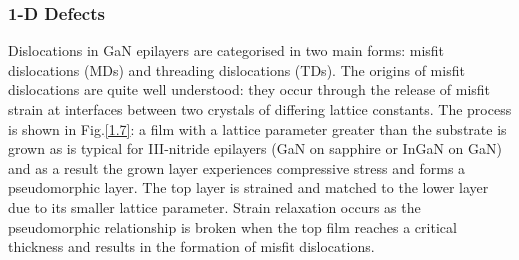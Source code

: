 \subsubsection{1-D Defects}
Dislocations in GaN epilayers are categorised in two main forms: misfit dislocations (MDs) and threading dislocations (TDs). The origins of misfit dislocations are quite well understood: they occur through the release of misfit strain at interfaces between two crystals of differing lattice constants. The process is shown in Fig.\ref{1.7}: a film with a lattice parameter greater than the substrate is grown as is typical for III-nitride epilayers (GaN on sapphire or InGaN on GaN) and as a result the grown layer experiences compressive stress and forms a pseudomorphic layer. The top layer is strained and matched to the lower layer due to its smaller lattice parameter. Strain relaxation occurs as the pseudomorphic relationship is broken when the top film reaches a critical thickness and results in the formation of misfit dislocations.

